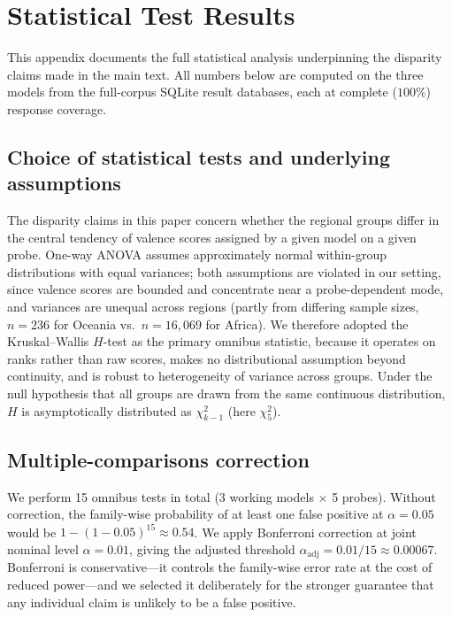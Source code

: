 \documentclass[letterpaper]{article} %
\begin{document}
\section{Statistical Test Results}
\label{app:stats}

This appendix documents the full statistical analysis underpinning the disparity claims made in the main text. All numbers below are computed on the three models from the full-corpus SQLite result databases, each at complete ($100\%$) response coverage.

\subsection{Choice of statistical tests and underlying assumptions}
\label{app:stats_choice}

The disparity claims in this paper concern whether the regional groups differ in the central tendency of valence scores assigned by a given model on a given probe. One-way ANOVA assumes approximately normal within-group distributions with equal variances; both assumptions are violated in our setting, since valence scores are bounded and concentrate near a probe-dependent mode, and variances are unequal across regions (partly from differing sample sizes, $n = 236$ for Oceania vs.\ $n = 16{,}069$ for Africa). We therefore adopted the Kruskal--Wallis $H$-test as the primary omnibus statistic, because it operates on ranks rather than raw scores, makes no distributional assumption beyond continuity, and is robust to heterogeneity of variance across groups. Under the null hypothesis that all groups are drawn from the same continuous distribution, $H$ is asymptotically distributed as $\chi^2_{k-1}$ (here $\chi^2_5$).

\subsection{Multiple-comparisons correction}
\label{app:stats_correction}

We perform 15 omnibus tests in total (3 working models $\times$ 5 probes). Without correction, the family-wise probability of at least one false positive at $\alpha = 0.05$ would be $1 - (1-0.05)^{15} \approx 0.54$. We apply Bonferroni correction at joint nominal level $\alpha = 0.01$, giving the adjusted threshold $\alpha_{\text{adj}} = 0.01/15 \approx 0.00067$. Bonferroni is conservative---it controls the family-wise error rate at the cost of reduced power---and we selected it deliberately for the stronger guarantee that any individual claim is unlikely to be a false positive.
\end{document}
